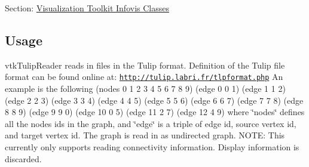 Section\-: \hyperlink{sec_vtkinfovis}{Visualization Toolkit Infovis Classes} \hypertarget{vtkwidgets_vtkxyplotwidget_Usage}{}\subsection{Usage}\label{vtkwidgets_vtkxyplotwidget_Usage}
vtk\-Tulip\-Reader reads in files in the Tulip format. Definition of the Tulip file format can be found online at\-: \href{http://tulip.labri.fr/tlpformat.php}{\tt http\-://tulip.\-labri.\-fr/tlpformat.\-php} An example is the following {\ttfamily  (nodes 0 1 2 3 4 5 6 7 8 9) (edge 0 0 1) (edge 1 1 2) (edge 2 2 3) (edge 3 3 4) (edge 4 4 5) (edge 5 5 6) (edge 6 6 7) (edge 7 7 8) (edge 8 8 9) (edge 9 9 0) (edge 10 0 5) (edge 11 2 7) (edge 12 4 9) } where \char`\"{}nodes\char`\"{} defines all the nodes ids in the graph, and \char`\"{}edge\char`\"{} is a triple of edge id, source vertex id, and target vertex id. The graph is read in as undirected graph. N\-O\-T\-E\-: This currently only supports reading connectivity information. Display information is discarded.

